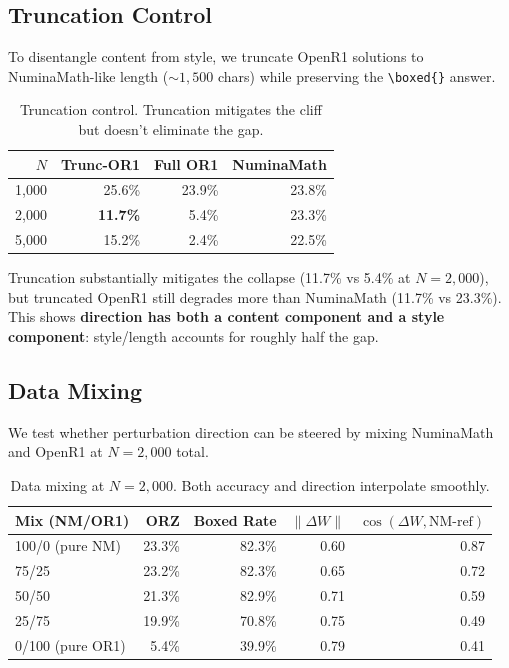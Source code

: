 \documentclass{article}
\begin{document}
\subsection{Truncation Control}

To disentangle content from style, we truncate OpenR1 solutions to NuminaMath-like length (${\sim}1{,}500$ chars) while preserving the \texttt{\textbackslash boxed\{\}} answer.

\begin{table}[h]
\centering
\caption{Truncation control. Truncation mitigates the cliff but doesn't eliminate the gap.}
\label{tab:truncation}
\small
\begin{tabular}{@{}rrrr@{}}
\toprule
$N$ & Trunc-OR1 & Full OR1 & NuminaMath \\
\midrule
1,000 & 25.6\% & 23.9\% & 23.8\% \\
2,000 & \textbf{11.7\%} & 5.4\% & 23.3\% \\
5,000 & 15.2\% & 2.4\% & 22.5\% \\
\bottomrule
\end{tabular}
\end{table}

Truncation substantially mitigates the collapse (11.7\% vs 5.4\% at $N{=}2{,}000$), but truncated OpenR1 still degrades more than NuminaMath (11.7\% vs 23.3\%). This shows \textbf{direction has both a content component and a style component}: style/length accounts for roughly half the gap.

\subsection{Data Mixing}

We test whether perturbation direction can be steered by mixing NuminaMath and OpenR1 at $N{=}2{,}000$ total.

\begin{table}[h]
\centering
\caption{Data mixing at $N{=}2{,}000$. Both accuracy and direction interpolate smoothly.}
\label{tab:mixing}
\small
\begin{tabular}{@{}lrrrr@{}}
\toprule
Mix (NM/OR1) & ORZ & Boxed Rate & $\|\Delta W\|$ & $\cos(\Delta W, \text{NM-ref})$ \\
\midrule
100/0 (pure NM) & 23.3\% & 82.3\% & 0.60 & 0.87 \\
75/25 & 23.2\% & 82.3\% & 0.65 & 0.72 \\
50/50 & 21.3\% & 82.9\% & 0.71 & 0.59 \\
25/75 & 19.9\% & 70.8\% & 0.75 & 0.49 \\
0/100 (pure OR1) & 5.4\% & 39.9\% & 0.79 & 0.41 \\
\bottomrule
\end{tabular}
\end{table}
\end{document}
